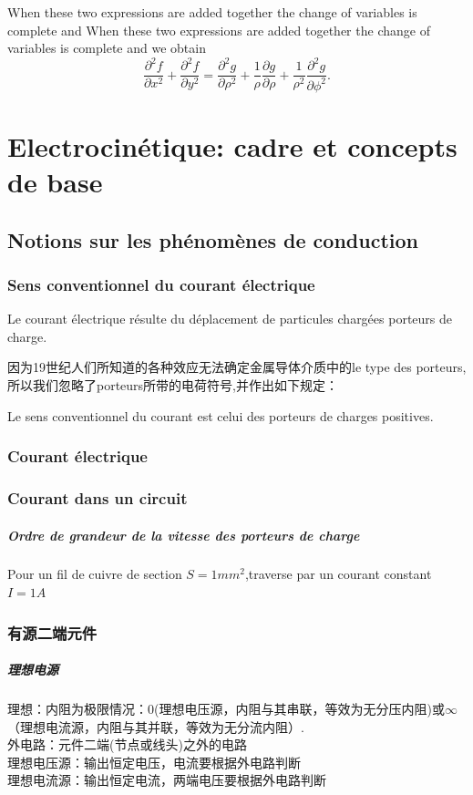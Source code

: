 \documentclass[12pt]{book}
\theoremstyle{definition}\newtheorem{dfn}{Définition}[chapter]
\theoremstyle{plain}\newtheorem{thm}{Théorème}[chapter]
\theoremstyle{plain}\newtheorem{prp}{Proposition}[chapter]
\theoremstyle{plain}\newtheorem{lem}{\bf Lemme}[chapter]
\theoremstyle{plain}\newtheorem{axm}{\bf Axiome}[chapter]
\theoremstyle{plain}\newtheorem{lmm}{\bf Lemme}[chapter]
\theoremstyle{plain}\newtheorem{cor}{\bf Corollaire}[chapter]
\theoremstyle{remark}\newtheorem{rem}{Remarque}[chapter]
\begin{document}
When these two expressions are added together the change of variables is complete and When these two expressions are added together the change of variables is complete and we obtain
$$
\frac{\partial^{2} f}{\partial x^{2}}+\frac{\partial^{2} f}{\partial y^{2}}=\frac{\partial^{2} g}{\partial \rho^{2}}+\frac{1}{\rho} \frac{\partial g}{\partial \rho}+\frac{1}{\rho^{2}} \frac{\partial^{2} g}{\partial \phi^{2}}.
$$
	\chapter{Electrocinétique: cadre et concepts de base}
	\section{Notions sur les phénomènes de conduction}
	\subsection{Sens conventionnel du courant électrique}
	Le courant électrique résulte du déplacement de particules chargées {\color{red} porteurs de charge}. 
	
	因为19世纪人们所知道的各种效应无法确定金属导体介质中的le type des porteurs,所以我们忽略了porteurs所带的电荷符号,并作出如下规定：
	
	
	Le sens conventionnel du courant est celui des porteurs de charges positives.

        
	\subsection{Courant électrique}
	\subsection{Courant dans un circuit}
	\paragraph{Ordre de grandeur de la vitesse des porteurs de charge}
	Pour un fil de cuivre de section $S=1mm^2$,traverse par un courant constant $I=1A$

\subsection{有源二端元件}
\paragraph{理想电源}理想：内阻为极限情况：$0$(理想电压源，内阻与其串联，等效为无分压内阻)或$\infty$（理想电流源，内阻与其并联，等效为无分流内阻）.
\\外电路：元件二端(节点或线头)之外的电路\\
理想电压源：输出恒定电压，电流要根据外电路判断
\\理想电流源：输出恒定电流，两端电压要根据外电路判断
\end{document}

